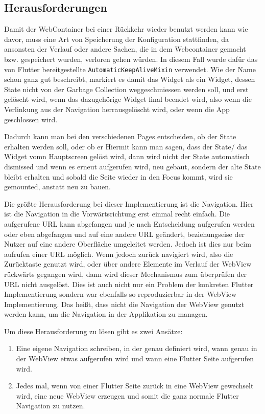 \subsection{Herausforderungen}
Damit der WebContainer bei einer Rückkehr wieder benutzt werden kann wie davor, muss eine Art von Speicherung der Konfiguration stattfinden, da ansonsten der Verlauf oder andere Sachen, die in dem Webcontainer gemacht bzw. gespeichert wurden, verloren gehen würden. In diesem Fall wurde dafür das von Flutter bereitgestellte \verb|AutomaticKeepAliveMixin| verwendet. Wie der Name schon ganz gut beschreibt, markiert es damit das Widget als ein Widget, dessen State nicht von der Garbage Collection weggeschmiessen werden soll, und erst gelöscht wird, wenn das dazugehörige Widget final beendet wird, also wenn die Verlinkung aus der Navigation herrausgelöscht wird, oder wenn die App geschlossen wird.

Dadurch kann man bei den verschiedenen Pages entscheiden, ob der State erhalten werden soll, oder ob er 
Hiermit kann man sagen, dass der State/ das Widget vomn Hauptscreen gelöst wird, dann wird nicht der State automatisch dismissed und wenn es erneut aufgerufen wird, neu gebaut, sondern der alte State bleibt erhalten und sobald die Seite wieder in den Focus kommt, wird sie gemounted, anstatt neu zu bauen.

Die größte Herausforderung bei dieser Implementierung ist die Navigation.
Hier ist die Navigation in die Vorwärtsrichtung erst einmal recht einfach. Die aufgerufene URL kann abgefangen und je nach Entscheidung aufgerufen werden oder eben abgefangen und auf eine andere URL geändert, beziehungseise der Nutzer auf eine andere Oberfläche umgeleitet werden. Jedoch ist dies nur beim aufrufen einer URL möglich. Wenn jedoch zurück navigiert wird, also die Zurücktaste genutzt wird, oder über andere Elemente im Verlauf der WebView rückwärts gegangen wird, dann wird dieser Mechanismus zum überprüfen der URL nicht ausgelöst. Dies ist auch nicht nur ein Problem der konkreten Flutter Implementierung sondern war ebenfalls so reproduzierbar in der WebView Implementierung. Das heißt, dass nicht die Navigation der WebView genutzt werden kann, um die Navigation in der Applikation zu managen.

Um diese Herausforderung zu lösen gibt es zwei Ansätze:
\begin{enumerate}
    \item Eine eigene Navigation schreiben, in der genau definiert wird, wann genau in der WebView etwas aufgerufen wird und wann eine Flutter Seite aufgerufen wird. 
    \item Jedes mal, wenn von einer Flutter Seite zurück in eine WebView gewechselt wird, eine neue WebView erzeugen und somit die ganz normale Flutter Navigation zu nutzen. 
\end{enumerate}

